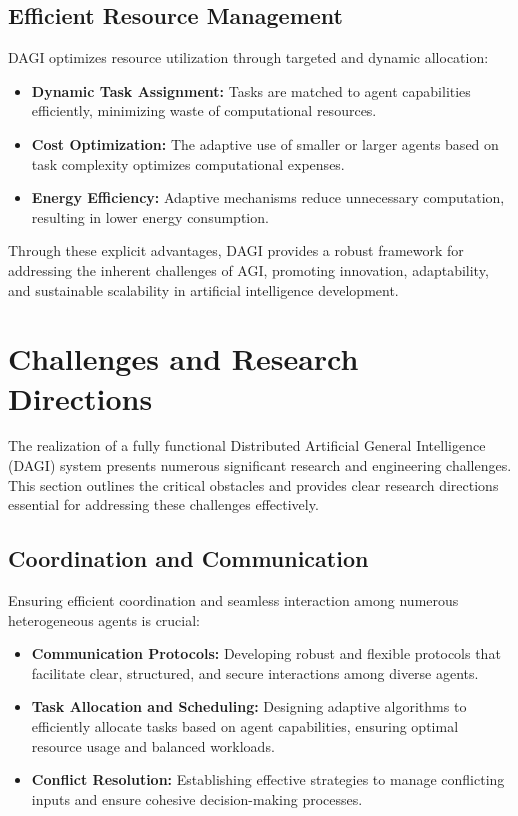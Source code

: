 \documentclass[12pt]{amsart}
\begin{document}
\subsection{Efficient Resource Management}

DAGI optimizes resource utilization through targeted and dynamic allocation:

\begin{itemize}
    \item \textbf{Dynamic Task Assignment:} Tasks are matched to agent capabilities efficiently, minimizing waste of computational resources.
    \item \textbf{Cost Optimization:} The adaptive use of smaller or larger agents based on task complexity optimizes computational expenses.
    \item \textbf{Energy Efficiency:} Adaptive mechanisms reduce unnecessary computation, resulting in lower energy consumption.
\end{itemize}

Through these explicit advantages, DAGI provides a robust framework for addressing the inherent challenges of AGI, promoting innovation, adaptability, and sustainable scalability in artificial intelligence development.



\section{Challenges and Research Directions}

The realization of a fully functional Distributed Artificial General Intelligence (DAGI) system presents numerous significant research and engineering challenges. This section outlines the critical obstacles and provides clear research directions essential for addressing these challenges effectively.

\subsection{Coordination and Communication}

Ensuring efficient coordination and seamless interaction among numerous heterogeneous agents is crucial:

\begin{itemize}
    \item \textbf{Communication Protocols:} Developing robust and flexible protocols that facilitate clear, structured, and secure interactions among diverse agents.
    \item \textbf{Task Allocation and Scheduling:} Designing adaptive algorithms to efficiently allocate tasks based on agent capabilities, ensuring optimal resource usage and balanced workloads.
    \item \textbf{Conflict Resolution:} Establishing effective strategies to manage conflicting inputs and ensure cohesive decision-making processes.
\end{itemize}
\end{document}

